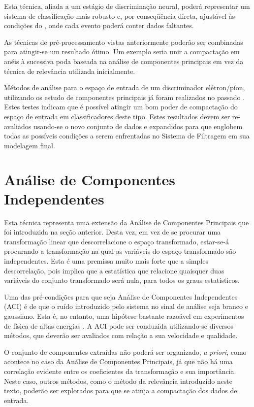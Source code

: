 Esta técnica, aliada a um estágio de discriminação neural, poderá representar
um sistema de classificação mais robusto e, por conseqüência direta, ajustável
às condições do , onde cada evento poderá conter dados faltantes.

As técnicas de pré-processamento vistas anteriormente poderão ser combinadas
para atingir-se um resultado ótimo. Um exemplo seria unir a compactação em
anéis à sucessiva poda baseada na análise de componentes principais em vez da
técnica de relevância utilizada inicialmente.

Métodos de análise para o espaço de entrada de um discriminador elétron/píon,
utilizando os estudo de componentes principais já foram realizados no passado
\cite{seixas:pca}. Estes testes indicam que é possível atingir um bom poder de
compactação do espaço de entrada em classificadores deste tipo. Estes
resultados devem ser re-avaliados usando-se o novo conjunto de dados e
expandidos para que englobem todas as possíveis condições a serem enfrentadas
no Sistema de Filtragem em sua modelagem final.

\section{Análise de Componentes Independentes}

Esta técnica representa uma extensão da Análise de Componentes Principais
\cite{oja-ica} que foi introduzida na seção anterior. Desta vez, em vez de
se procurar uma transformação linear que descorrelacione o espaço
transformado, estar-se-á procurando a transformação na qual as variáveis do
espaço transformado são independentes. Esta é uma premissa muito mais forte
que a simples descorrelação, pois implica que a estatística que relacione
quaisquer duas variáveis do conjunto transformado será nula, para todos os
graus estatísticos.

Uma das pré-condições para que seja Análise de Componentes Independentes (ACI)
é de que o ruído introduzido pelo sistema no sinal de análise seja branco e
gaussiano. Esta é, no entanto, uma hipótese bastante razoável em experimentos
de física de altas energias \cite{knoll, leo}. A ACI pode ser conduzida
utilizando-se diversos métodos, que deverão ser avaliados com relação a sua
velocidade e qualidade.

O conjunto de componentes extraídas não poderá ser organizado, \textit{a
priori}, como acontece no caso da Análise de Componentes Principais, já que
não há uma correlação evidente entre os coeficientes da transformação e sua
importância. Neste caso, outros métodos, como o método da relevância
introduzido neste texto, poderão ser explorados para que se atinja a
compactação dos dados de entrada.


